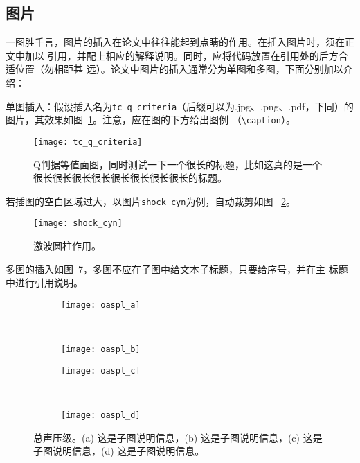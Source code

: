 \subsection{图片}\label{sub:images}

一图胜千言，图片的插入在论文中往往能起到点睛的作用。在插入图片时，须在正文中加以
引用，并配上相应的解释说明。同时，应将代码放置在引用处的后方合适位置（勿相距甚
远）。论文中图片的插入通常分为单图和多图，下面分别加以介绍：

单图插入：假设插入名为\verb|tc_q_criteria|（后缀可以为.jpg、.png、.pdf，下同）的
图片，其效果如图~\ref{fig:tc_q_criteria}。注意，应在图的下方给出图例
（\verb|\caption|）。
\begin{figure}[!htbp]
    \centering
    \texttt{[image: tc\_q\_criteria]}
    \caption[Q判据等值面图]{Q判据等值面图，同时测试一下一个很长的标题，比如这真的是一个很长很长很长很长很长很长很长很长的标题。}
    \label{fig:tc_q_criteria}
\end{figure}

若插图的空白区域过大，以图片\verb|shock_cyn|为例，自动裁剪如图
~\ref{fig:shock_cyn}。
\begin{figure}[!htbp]
    \centering
    \texttt{[image: shock\_cyn]}
    \caption[激波圆柱作用]{激波圆柱作用。}
    \label{fig:shock_cyn}
\end{figure}

多图的插入如图~\ref{fig:oaspl}，多图不应在子图中给文本子标题，只要给序号，并在主
标题中进行引用说明。
\begin{figure}[!htbp]
    \centering
    \begin{subfigure}[b]{0.35\textwidth}
      \texttt{[image: oaspl\_a]}
      \caption{}
      \label{fig:oaspl_a}
    \end{subfigure}%
    ~%
    \begin{subfigure}[b]{0.35\textwidth}
      \texttt{[image: oaspl\_b]}
      \caption{}
      \label{fig:oaspl_b}
    \end{subfigure}
    \begin{subfigure}[b]{0.35\textwidth}
      \texttt{[image: oaspl\_c]}
      \caption{}
      \label{fig:oaspl_c}
    \end{subfigure}%
    ~%
    \begin{subfigure}[b]{0.35\textwidth}
      \texttt{[image: oaspl\_d]}
      \caption{}
      \label{fig:oaspl_d}
    \end{subfigure}
    \caption[总声压级]{总声压级。(a) 这是子图说明信息，(b) 这是子图说明信息，(c) 这是子图说明信息，(d) 这是子图说明信息。}
    \label{fig:oaspl}
\end{figure}

